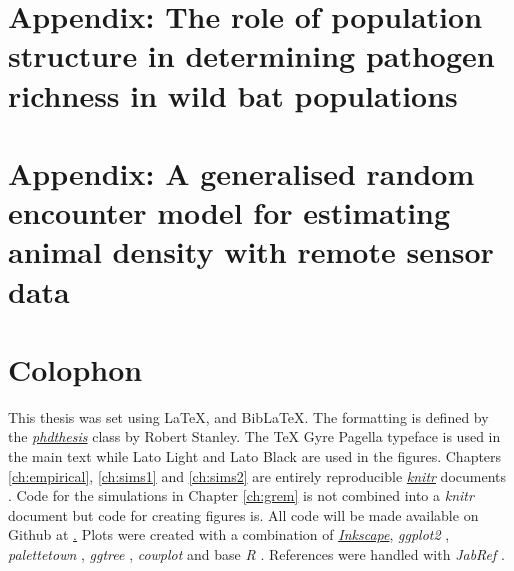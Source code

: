 



\appendix


\chapter{Appendix: The role of population structure in determining pathogen richness in wild bat populations}
\label{empirAppendix}




\chapter{Appendix: A generalised random encounter model for estimating animal density with remote sensor data}
\label{gremAppendix}




\chapter{Colophon}
\label{appendixlabel3}


This thesis was set using \LaTeX, \XeLaTeX\vspace{1mm} and Bib\LaTeX. \vspace{-0.12cm} 
The formatting is defined by the \href{https://github.com/robjstan/latex-phdthesis}{\emph{phdthesis}} class by Robert Stanley.
The TeX Gyre Pagella typeface is used in the main text while { Lato Light} and { \color[rgb]{0.75,0.75,0.75} Lato Black} are used in the figures.
Chapters \ref{ch:empirical}, \ref{ch:sims1} and \ref{ch:sims2} are entirely reproducible \href{http://yihui.name/knitr/}{\emph{knitr}} documents \cite{knitr}.
Code for the simulations in Chapter \ref{ch:grem} is not combined into a \emph{knitr} document but code for creating figures is.
All code will be made available on Github at \href{https://github.com/timcdlucas/PhDThesis}. %
Plots were created with a combination of \href{www.inkscape.org}{\emph{Inkscape}}, \emph{ggplot2} \cite{ggplot2}, \emph{palettetown} \cite{palettetown}, \emph{ggtree} \cite{ggtree}, \emph{cowplot} \cite{cowplot} and base \emph{R} \cite{R}.
References were handled with \emph{JabRef} \cite{JabRef_software}. 

